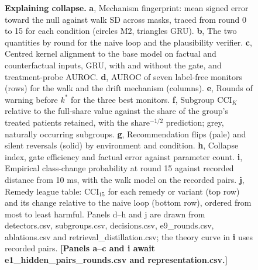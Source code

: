 \documentclass[11pt,a4paper]{article}
\newcommand{\tbd}[1]{{\color{red}\textbf{[#1]}}}
\newcommand{\CCI}{\mathrm{CCI}}
\begin{document}
\begin{figure}[!htbp]\centering
{}
\caption{\textbf{Explaining collapse.} \textbf{a}, Mechanism fingerprint: mean signed error toward the null against walk SD across masks, traced from round 0 to 15 for each condition (circles M2, triangles GRU). \textbf{b}, The two quantities by round for the naive loop and the plausibility verifier. \textbf{c}, Centred kernel alignment to the base model on factual and counterfactual inputs, GRU, with and without the gate, and treatment-probe AUROC. \textbf{d}, AUROC of seven label-free monitors (rows) for the walk and the drift mechanism (columns). \textbf{e}, Rounds of warning before $k^*$ for the three best monitors. \textbf{f}, Subgroup $\CCI_K$ relative to the full-share value against the share of the group's treated patients retained, with the share$^{-1/2}$ prediction; grey, naturally occurring subgroups. \textbf{g}, Recommendation flips (pale) and silent reversals (solid) by environment and condition. \textbf{h}, Collapse index, gate efficiency and factual error against parameter count. \textbf{i}, Empirical class-change probability at round 15 against recorded distance from 10 ms, with the walk model on the recorded pairs. \textbf{j}, Remedy league table: $\CCI_{15}$ for each remedy or variant (top row) and its change relative to the naive loop (bottom row), ordered from most to least harmful. Panels d--h and j are drawn from detectors.csv, subgroups.csv, decisions.csv, e9\_rounds.csv, ablations.csv and retrieval\_distillation.csv; the theory curve in \textbf{i} uses recorded pairs. \tbd{Panels a--c and i await e1\_hidden\_pairs\_rounds.csv and representation.csv.}}\label{fig:explain}
\end{figure}
\FloatBarrier
\end{document}

